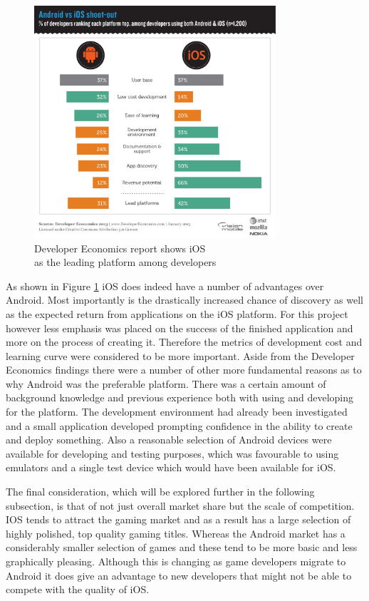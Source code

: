 \begin{figure}[H]
  \centering
   \includegraphics[width=0.8\textwidth]{Images/android_ios.png}
  \caption{Developer Economics report\cite{de} shows iOS\\as the leading platform among developers}
  \label{fig:de}
\end{figure}

As shown in Figure \ref{fig:de} iOS does indeed have a number of advantages over Android. Most importantly is the drastically increased chance of discovery as well as the expected return from applications on the iOS platform. For this project however less emphasis was placed on the success of the finished application and more on the process of creating it. Therefore the metrics of development cost and learning curve were considered to be more important. Aside from the Developer Economics findings there were a number of other more fundamental reasons as to why Android was the preferable platform. There was a certain amount of background knowledge and previous experience both with using and developing for the platform. The development environment had already been investigated and a small application developed prompting confidence in the ability to create and deploy something. Also a reasonable selection of Android devices were available for developing and testing purposes, which was favourable to using emulators and a single test device which would have been available for iOS.

The final consideration, which will be explored further in the following subsection, is that of not just overall market share but the scale of competition. IOS tends to attract the gaming market and as a result has a large selection of highly polished, top quality gaming titles. Whereas the Android market has a considerably smaller selection of games and these tend to be more basic and less graphically pleasing. Although this is changing as game developers migrate to Android it does give an advantage to new developers that might not be able to compete with the quality of iOS. 



